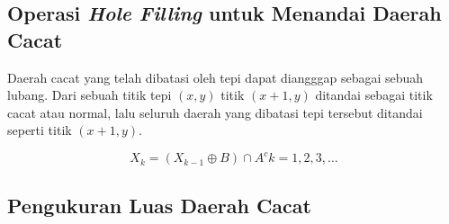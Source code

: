 \documentclass[laporan.tex]{subfiles}
\begin{document}
\subsection{Operasi \emph{Hole Filling} untuk Menandai Daerah Cacat}

Daerah cacat yang telah dibatasi oleh tepi dapat diangggap sebagai sebuah lubang. Dari sebuah titik tepi $(x, y)$ titik $(x+1, y)$ ditandai sebagai titik cacat atau normal, lalu seluruh daerah yang dibatasi tepi tersebut ditandai seperti titik $(x+1, y)$.

\begin{equation}
X_k = (X_{k-1} \oplus B) \cap A^c  k=1,2,3,\ldots
\end{equation}

\subsection{Pengukuran Luas Daerah Cacat}
\end{document}
